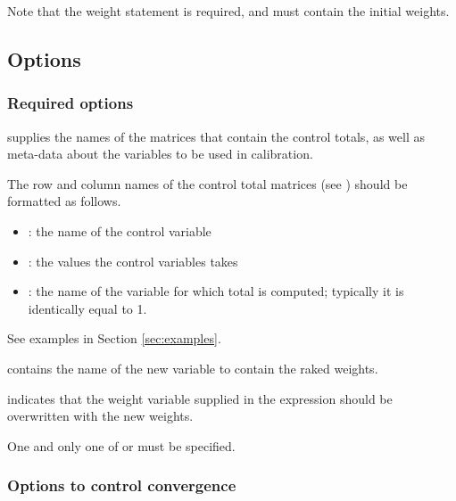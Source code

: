 \hangpara
Note that the weight statement \stcmd{[pw=\varname]} is required, and must contain the initial weights.

\subsection{Options}

\subsubsection{Required options}

\hangpara
{} \RB\stcmd{)}
supplies the names of the matrices that contain the control
totals, as well as meta-data about the variables to be used
in calibration.

\begin{sttech}
The row and column names of the control total matrices
(see ) should be formatted as follows.
\begin{itemize}
    \item {}: the name of the control variable
    \item {}: the values the control variables takes
    \item {}: the name of the variable for which total is computed;
          typically it is identically equal to 1.
\end{itemize}
See examples in Section \ref{sec:examples}.
\end{sttech}

\hangpara
{}
contains the name of the new variable to contain the raked weights.

\hangpara
{} indicates that the weight variable supplied in the
\stcmd{[pw=\varname]} expression should be overwritten with the new weights.

One and only one of  or  must be specified.

\subsubsection{Options to control convergence}

